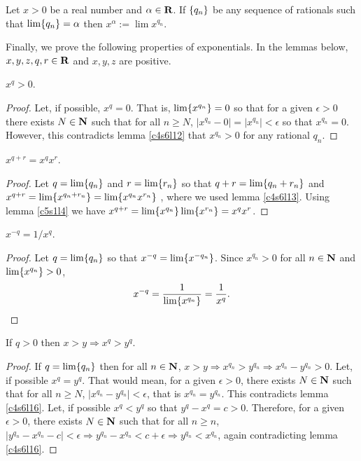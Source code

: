 \begin{defn}\label{c5s7d1}
Let $x > 0$ be a real number and $\alpha \in \mathbf{R}$. If $\{q_n\}$ be
any sequence of rationals such that $\lim\{q_n\} = \alpha$ then $x^\alpha
:= \lim x^{q_n}$.
\end{defn}

Finally, we prove the following properties of exponentials. In the lemmas
below, $x, y, z, q, r \in \mathbf{R}$ and $x, y, z$ are positive.
\begin{lem}\label{c5s7l3}
$x^q > 0$.
\end{lem}
\begin{proof}
Let, if possible, $x^q = 0$. That is, $\lim\{x^{q_n}\} = 0$ so that for
a given $\epsilon > 0$ there exists $N \in \mathbf{N}$ such that for all $n \ge
N$, $|x^{q_n} - 0| = |x^{q_n}| < \epsilon$ so that $x^{q_n} = 0$. However,
this contradicts lemma \ref{c4s6l12} that $x^{q_n} > 0$ for any rational
$q_n$.
\end{proof}

\begin{lem}\label{c5s7l4}
$x^{q+r} = x^q x^r$.
\end{lem}
\begin{proof}
Let $q = \lim\{q_n\}$ and $r = \lim\{r_n\}$ so that $q + r = \lim\{
q_n + r_n\}$ and $x^{q+r} = \lim\{x^{q_n+r_n}\} = \lim\{x^{q_n}x^{r_n}\}$
, where we used lemma \ref{c4s6l13}. Using lemma \ref{c5s1l4} we have 
$x^{q+r} = \lim\{x^{q_n}\}\lim\{x^{r_n}\} = x^qx^r$.
\end{proof}

\begin{lem}\label{c5s7l5}
$x^{-q} = 1/x^q$.
\end{lem}
\begin{proof}
Let $q = \lim\{q_n\}$ so that $x^{-q} = \lim\{x^{-q_n}\}$. Since 
$x^{q_n} > 0$ for all $n \in \mathbf{N}$ and $\lim\{x^{q_n}\} > 0$,
\[
x^{-q} = \frac{1}{\lim\{x^{q_n}\}} = \frac{1}{x^q}.
\]
\end{proof}

\begin{lem}\label{c5s7l6}
If $q > 0$ then $x > y \Rightarrow x^q > y^q$.
\end{lem}
\begin{proof}
If $q = \lim\{q_n\}$ then for all $n \in \mathbf{N}$, $x > y \Rightarrow x^{q_n}
> y^{q_n} \Rightarrow x^{q_n} - y^{q_n} > 0$. Let, if possible $x^q = y^q$.
That would mean, for a given $\epsilon > 0$, there exists $N \in \mathbf{N}$ such
that for all $n \ge N$, $|x^{q_n} - y^{q_n}| < \epsilon$, that is $x^{q_n}
= y^{q_n}$. This contradicts lemma \ref{c4s6l16}. Let, if possible $x^q <
y^q$ so that $y^q - x^q = c > 0$. Therefore, for a given $\epsilon > 0$, 
there exists $N \in \mathbf{N}$ such that for all $n \ge n$, $|y^{q_n} - x^{q_n} -
c| < \epsilon \Rightarrow y^{q_n} - x^{q_n} < c + \epsilon \Rightarrow 
y^{q_n} < x^{q_n}$, again contradicting lemma \ref{c4s6l16}.
\end{proof}

